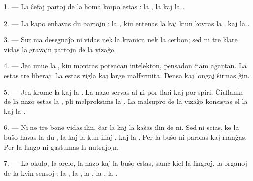 
\VUsaut{4.0mm}
\VUsaut{2.0mm}

\VUsaut{2.4mm}
\VUsaut{3.0mm}

\VUsaut{3.0mm}

1. --- La ĉefaj partoj de la homa korpo estas : la , la
 kaj la .

2. --- La kapo enhavas du partojn : la , kiu entenas la
 kaj kiun kovras la , kaj la .

3. --- Sur nia desegnaĵo ni vidas nek la kranion nek la cerbon; sed ni tre
klare vidas la gravajn partojn de la vizaĝo.

4. --- Jen unue la , kiu montras potencan intelekton, pensadon
ĉiam agantan. La  estas tre liberaj. La  estas
vigla kaj large malfermita. Densa  kaj longaj 
ŝirmas ĝin.

5. --- Jen krome la  kaj la . La nazo servas al
ni por flari kaj por spiri. Ĉiuflanke de la nazo estas la ,
pli malproksime la . La malsupro de la vizaĝo konsistas el la
 kaj la .

6. --- Ni ne tre bone vidas ilin, ĉar la  kaj la
 kaŝas ilin de ni. Sed ni scias, ke la buŝo havas la du
, la  kaj la  kun iliaj , kaj la . Per la buŝo ni
parolas kaj manĝas. Per la lango ni gustumas la nutraĵojn.

7. --- La okulo, la orelo, la nazo kaj la buŝo estas, same kiel la fingroj,
la organoj de la kvin sensoj : la , la , la
, la , la .

